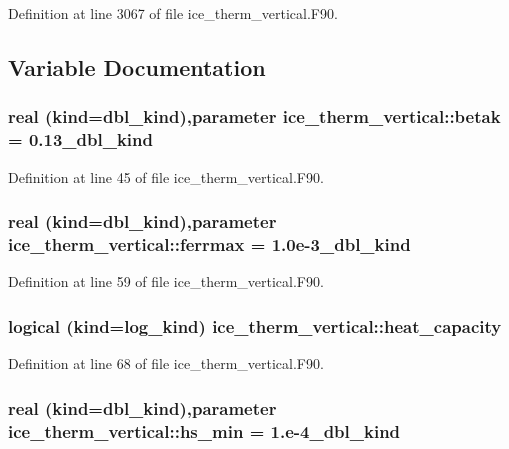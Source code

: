 Definition at line 3067 of file ice\_\-therm\_\-vertical.F90.

\subsection{Variable Documentation}
\hypertarget{namespaceice__therm__vertical_a5d1e969b838504de79a78a45daba6424}{
\subsubsection[{betak}]{\setlength{\rightskip}{0pt plus 5cm}real (kind=dbl\_\-kind),parameter {\bf ice\_\-therm\_\-vertical::betak} = 0.13\_\-dbl\_\-kind}}
\label{namespaceice__therm__vertical_a5d1e969b838504de79a78a45daba6424}


Definition at line 45 of file ice\_\-therm\_\-vertical.F90.\hypertarget{namespaceice__therm__vertical_a0721a294c629506af790049e6d607d53}{
\subsubsection[{ferrmax}]{\setlength{\rightskip}{0pt plus 5cm}real (kind=dbl\_\-kind),parameter {\bf ice\_\-therm\_\-vertical::ferrmax} = 1.0e-\/3\_\-dbl\_\-kind}}
\label{namespaceice__therm__vertical_a0721a294c629506af790049e6d607d53}


Definition at line 59 of file ice\_\-therm\_\-vertical.F90.\hypertarget{namespaceice__therm__vertical_a533694de6308b9a0b8839ba5dacc54af}{
\subsubsection[{heat\_\-capacity}]{\setlength{\rightskip}{0pt plus 5cm}logical (kind=log\_\-kind) {\bf ice\_\-therm\_\-vertical::heat\_\-capacity}}}
\label{namespaceice__therm__vertical_a533694de6308b9a0b8839ba5dacc54af}


Definition at line 68 of file ice\_\-therm\_\-vertical.F90.\hypertarget{namespaceice__therm__vertical_af7421836575fc4323bfe4b53fbc5f1ac}{
\subsubsection[{hs\_\-min}]{\setlength{\rightskip}{0pt plus 5cm}real (kind=dbl\_\-kind),parameter {\bf ice\_\-therm\_\-vertical::hs\_\-min} = 1.e-\/4\_\-dbl\_\-kind}}
\label{namespaceice__therm__vertical_af7421836575fc4323bfe4b53fbc5f1ac}


